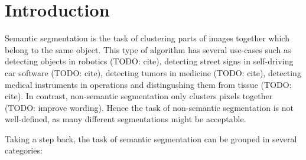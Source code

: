 \section{Introduction}\label{sec:introduction}
Semantic segmentation is the task of clustering parts of images together which
belong to the same object. This type of algorithm has several use-cases such as
detecting objects in robotics (TODO: cite), detecting street signs in
self-driving car software (TODO: cite), detecting tumors in medicine (TODO:
cite), detecting medical instruments in operations and distingushing them from
tissue (TODO: cite). In contrast, non-semantic segmentation only clusters
pixels together (TODO: improve wording). Hence the task of non-semantic
segmentation is not well-defined, as many different segmentations might be
acceptable.




Taking a step back, the task of semantic segmentation can be grouped in several
categories:

